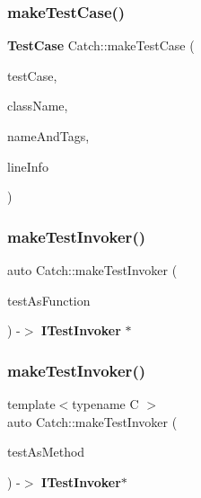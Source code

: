 \subsubsection{makeTestCase()}
{\footnotesize\ttfamily \textbf{ Test\+Case} Catch\+::make\+Test\+Case (\begin{DoxyParamCaption}\item[{\textbf{ I\+Test\+Invoker} $\ast$}]{test\+Case,  }\item[{std\+::string const \&}]{class\+Name,  }\item[{\textbf{ Name\+And\+Tags} const \&}]{name\+And\+Tags,  }\item[{\textbf{ Source\+Line\+Info} const \&}]{line\+Info }\end{DoxyParamCaption})}

\mbox{\label{namespace_catch_ab3d8ccbc900fe50322c39ecbba52f536}} 
\subsubsection{makeTestInvoker()\hspace{0.1cm}{\footnotesize\ttfamily [1/2]}}
{\footnotesize\ttfamily auto Catch\+::make\+Test\+Invoker (\begin{DoxyParamCaption}\item[{void($\ast$)()}]{test\+As\+Function }\end{DoxyParamCaption}) -\/$>$  \textbf{ I\+Test\+Invoker} $\ast$\hspace{0.3cm}{\ttfamily [noexcept]}}

\mbox{\label{namespace_catch_a82a954c4d70afa716115820dc7dc8d24}} 
\subsubsection{makeTestInvoker()\hspace{0.1cm}{\footnotesize\ttfamily [2/2]}}
{\footnotesize\ttfamily template$<$typename C $>$ \\
auto Catch\+::make\+Test\+Invoker (\begin{DoxyParamCaption}\item[{void(C\+::$\ast$)()}]{test\+As\+Method }\end{DoxyParamCaption}) -\/$>$ \textbf{ I\+Test\+Invoker}$\ast$ \hspace{0.3cm}{\ttfamily [noexcept]}}



